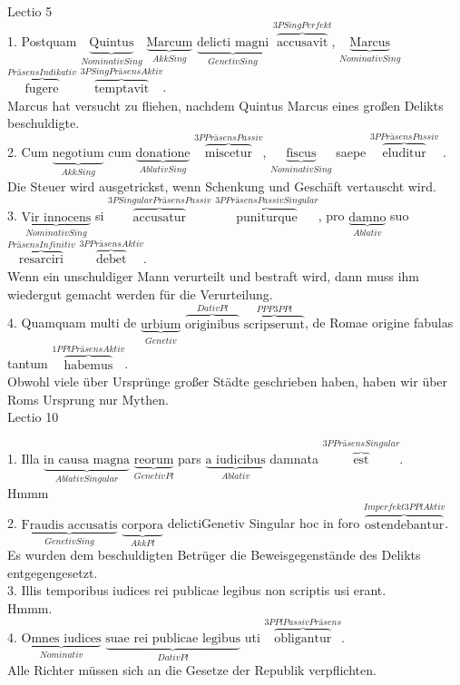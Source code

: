\documentclass[a4paper]{article}
\newcommand{\ann}[2]{$\underbrace{\text{#1}}_{#2}$}
\newcommand{\ovv}[2]{$\overbrace{\text{#1}}^{#2}$}
\begin{document}
Lectio 5 \\

1. Postquam \ann{Quintus}{Nominativ Sing} \ann{Marcum}{Akk Sing} \ann{delicti magni}{Genetiv Sing} \ovv{accusavit}{3P Sing Perfekt}, \ann{Marcus}{Nominativ Sing} \ovv{fugere}{Präsens Indikativ} \ovv{temptavit}{3P Sing Präsens Aktiv}. \\

Marcus hat versucht zu fliehen, nachdem Quintus Marcus eines großen Delikts beschuldigte. \\

2. Cum \ann{negotium}{Akk Sing} cum \ann{donatione}{Ablativ Sing} \ovv{miscetur}{3P Präsens Passiv}, \ann{fiscus}{Nominativ Sing} saepe \ovv{eluditur}{3P Präsens Passiv} . \\

Die Steuer wird ausgetrickst, wenn Schenkung und Geschäft vertauscht wird. \\

3. \ann{Vir innocens}{Nominativ Sing} si \ovv{accusatur}{3P Singular Präsens Passiv} \ovv{puniturque}{3P Präsens Passiv Singular}, pro \ann{damno}{Ablativ} suo \ovv{resarciri}{Präsens Infinitiv} \ovv{debet}{3P Präsens Aktiv}. \\


Wenn ein unschuldiger Mann verurteilt und bestraft wird, dann muss ihm wiedergut gemacht werden für die Verurteilung. \\

4. Quamquam multi de \ann{urbium}{Genetiv} \ovv{originibus}{Dativ Pl} \ovv{scripserunt}{PPP 3P Pl}, de Romae origine fabulas tantum \ovv{habemus}{1P Pl Präsens Aktiv}. \\

Obwohl viele über Ursprünge großer Städte geschrieben haben, haben wir über Roms Ursprung nur Mythen. \\

Lectio 10

1. Illa \ann{in causa magna}{Ablativ Singular} \ann{reorum}{Genetiv Pl} pars \ann{a iudicibus}{Ablativ} damnata \ovv{est}{3P Präsens Singular}. \\

Hmmm \\

2. \ann{Fraudis accusatis}{Genetiv Sing} \ann{corpora}{Akk Pl} {delicti}{Genetiv Singular} hoc in foro \ovv{ostendebantur}{Imperfekt 3P Pl Aktiv}. \\

Es wurden dem beschuldigten Betrüger die Beweisgegenstände des Delikts entgegengesetzt.\\

3. Illis temporibus iudices rei publicae legibus non scriptis usi erant. \\

Hmmm. \\

4. \ann{Omnes iudices}{Nominativ} \ann{suae rei publicae legibus}{Dativ Pl} uti \ovv{obligantur}{3P Pl Passiv Präsens}. \\

Alle Richter müssen sich an die Gesetze der Republik verpflichten.
\end{document}
